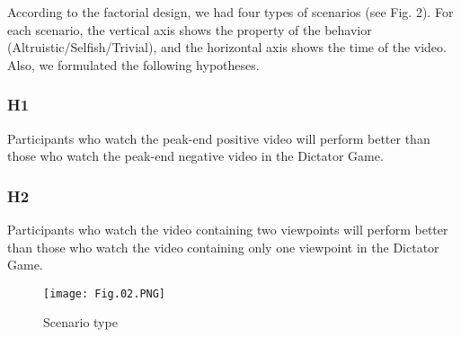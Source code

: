 \documentclass[runningheads]{llncs}
\begin{document}
According to the factorial design, we had four types of scenarios (see Fig. 2). For each scenario, the vertical axis shows the property of the behavior (Altruistic/Selfish/Trivial), and the horizontal axis shows the time of the video. Also, we formulated the following hypotheses.

\subsubsection{H1} Participants who watch the peak-end positive video will perform better than those who watch the peak-end negative video in the Dictator Game.

\subsubsection{H2} Participants who watch the video containing two viewpoints will perform better than those who watch the video containing only one viewpoint in the Dictator Game.




\begin{figure}[tb]
\centering
\texttt{[image: Fig.02.PNG]}
\caption{Scenario type} \label{fig2}
\end{figure}
\end{document}
